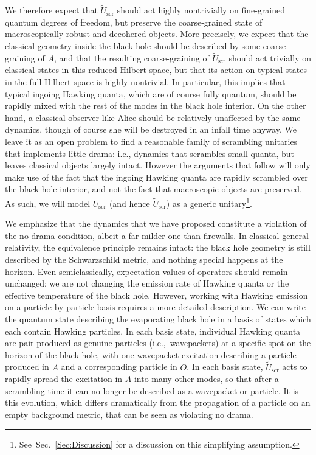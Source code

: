 \documentclass[a4paper,11pt]{article}
\theoremstyle{definition}
\newcommand{\Sec}[1]{Sec.~\ref{#1}}
\begin{document}
We therefore expect that $\tilde U_\mathrm{scr}$ should act highly nontrivially on fine-grained quantum degrees of freedom, but preserve the coarse-grained state of macroscopically robust and decohered objects. 
More precisely, we expect that the classical geometry inside the black hole should be described by some coarse-graining of $A$, and that the resulting coarse-graining of $\tilde U_\mathrm{scr}$ should act trivially on classical states in this reduced Hilbert space, but that its action on typical states in the full Hilbert space is highly nontrivial.
In particular, this implies that typical ingoing Hawking quanta, which are of course fully quantum, should be rapidly mixed with the rest of the modes in the black hole interior.
On the other hand, a classical observer like Alice should be relatively unaffected by the same dynamics, though of course she will be destroyed in an infall time anyway.
We leave it as an open problem to find a reasonable family of scrambling unitaries that implements little-drama: i.e., dynamics that scrambles small quanta, but leaves classical objects largely intact.
However the arguments that follow will only make use of the fact that the ingoing Hawking quanta are rapidly scrambled over the black hole interior, and not the fact that macroscopic objects are preserved. As such, we will model $U_{\mathrm{scr}}$ (and hence $\tilde U_\mathrm{scr}$) as a generic unitary\footnote{See~\Sec{Sec:Discussion} for a discussion on this simplifying assumption.}.


We emphasize that the dynamics that we have proposed constitute a violation of the no-drama condition, albeit a far milder one than firewalls.
In classical general relativity, the equivalence principle remains intact: the black hole geometry is still described by the Schwarzschild metric, and nothing special happens at the horizon.
Even semiclassically, expectation values of operators should remain unchanged: we are not changing the emission rate of Hawking quanta or the effective temperature of the black hole.
However, working with Hawking emission on a particle-by-particle basis requires a more detailed description. 
We can write the quantum state describing the evaporating black hole in a basis of states which each contain Hawking particles.
In each basis state, individual Hawking quanta are pair-produced as genuine particles (i.e.,\ wavepackets) at a specific spot on the horizon of the black hole, with one wavepacket excitation describing a particle produced in $A$ and a corresponding particle in $O$.
In each basis state, $\tilde U_\mathrm{scr}$ acts to rapidly spread the excitation in $A$ into many other modes, so that after a scrambling time it can no longer be described as a wavepacket or particle.
It is this evolution, which differs dramatically from the propagation of a particle on an empty background metric, that can be seen as violating no drama.
\end{document}
